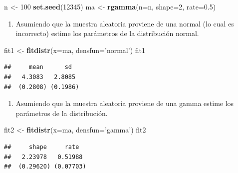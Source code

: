 \documentclass[10pt,]{krantz}
\makeatletter
\newenvironment{Shaded}{\begin{snugshade}}{\end{snugshade}}
\newcommand{\KeywordTok}[1]{\textcolor[rgb]{0.13,0.29,0.53}{\textbf{#1}}}
\newcommand{\DataTypeTok}[1]{\textcolor[rgb]{0.13,0.29,0.53}{#1}}
\newcommand{\DecValTok}[1]{\textcolor[rgb]{0.00,0.00,0.81}{#1}}
\newcommand{\FloatTok}[1]{\textcolor[rgb]{0.00,0.00,0.81}{#1}}
\newcommand{\StringTok}[1]{\textcolor[rgb]{0.31,0.60,0.02}{#1}}
\newcommand{\NormalTok}[1]{#1}
\providecommand{\tightlist}{%
  \setlength{\itemsep}{0pt}\setlength{\parskip}{0pt}}
\newenvironment{kframe}{%
\medskip{}
\setlength{\fboxsep}{.8em}
 \def\at@end@of@kframe{}%
 \ifinner\ifhmode%
  \def\at@end@of@kframe{\end{minipage}}%
  \begin{minipage}{\columnwidth}%
 \fi\fi%
 \def\FrameCommand##1{\hskip\@totalleftmargin \hskip-\fboxsep
 \colorbox{shadecolor}{##1}\hskip-\fboxsep
     \hskip-\linewidth \hskip-\@totalleftmargin \hskip\columnwidth}%
 \MakeFramed {\advance\hsize-\width
   \@totalleftmargin\z@ \linewidth\hsize
   \@setminipage}}%
 {\par\unskip\endMakeFramed%
 \at@end@of@kframe}
\renewenvironment{Shaded}{\begin{kframe}}{\end{kframe}}
\makeatother
\begin{document}
\begin{Shaded}
\begin{Highlighting}[]
\NormalTok{n <-}\StringTok{ }\DecValTok{100}
\KeywordTok{set.seed}\NormalTok{(}\DecValTok{12345}\NormalTok{)}
\NormalTok{ma <-}\StringTok{ }\KeywordTok{rgamma}\NormalTok{(}\DataTypeTok{n=}\NormalTok{n, }\DataTypeTok{shape=}\DecValTok{2}\NormalTok{, }\DataTypeTok{rate=}\FloatTok{0.5}\NormalTok{)}
\end{Highlighting}
\end{Shaded}

\begin{enumerate}
\def\labelenumi{\arabic{enumi})}
\tightlist
\item
  Asumiendo que la muestra aleatoria proviene de una normal (lo cual es
  incorrecto) estime los parámetros de la distribución normal.
\end{enumerate}

\begin{Shaded}
\begin{Highlighting}[]
\NormalTok{fit1 <-}\StringTok{ }\KeywordTok{fitdistr}\NormalTok{(}\DataTypeTok{x=}\NormalTok{ma, }\DataTypeTok{densfun=}\StringTok{'normal'}\NormalTok{)}
\NormalTok{fit1}
\end{Highlighting}
\end{Shaded}

\begin{verbatim}
##     mean      sd  
##   4.3083   2.8085 
##  (0.2808) (0.1986)
\end{verbatim}

\begin{enumerate}
\def\labelenumi{\arabic{enumi})}
\setcounter{enumi}{1}
\tightlist
\item
  Asumiendo que la muestra aleatoria proviene de una gamma estime los
  parámetros de la distribución.
\end{enumerate}

\begin{Shaded}
\begin{Highlighting}[]
\NormalTok{fit2 <-}\StringTok{ }\KeywordTok{fitdistr}\NormalTok{(}\DataTypeTok{x=}\NormalTok{ma, }\DataTypeTok{densfun=}\StringTok{'gamma'}\NormalTok{)}
\NormalTok{fit2}
\end{Highlighting}
\end{Shaded}

\begin{verbatim}
##     shape     rate  
##   2.23978   0.51988 
##  (0.29620) (0.07703)
\end{verbatim}
\end{document}
